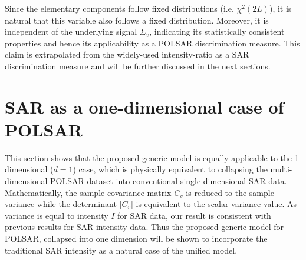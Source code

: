 \documentclass[journal]{IEEEtran}
\begin{document}

Since the elementary components follow fixed distributions (i.e. $\chi^2(2L)$),
  it is natural that this variable also follows a fixed distribution.
Moreover, it is independent of the underlying signal $\Sigma_v$,
  indicating its statistically consistent properties and hence its applicability as a POLSAR discrimination measure.
This claim is extrapolated from the widely-used intensity-ratio as a SAR discrimination measure
  and will be further discussed in the next sections.

\section{SAR as a one-dimensional case of POLSAR}
\label{sec:sar_special_case_of_polsar}

This section shows that the proposed generic model is equally  applicable to the 1-dimensional ($d=1$) case,
  which is physically equivalent to  collapsing the multi-dimensional POLSAR dataset  into conventional single dimensional SAR data.
Mathematically, the sample covariance matrix $C_v$ is reduced to the sample variance while the determinant $|C_v|$ is equivalent to  the scalar variance value.
As variance is equal to intensity $I$ for SAR data, our result is consistent with previous results for SAR intensity data.
Thus the proposed generic model for POLSAR, collapsed into one dimension will be shown to incorporate the traditional SAR intensity as a natural case of the unified model.
  
\end{document}
